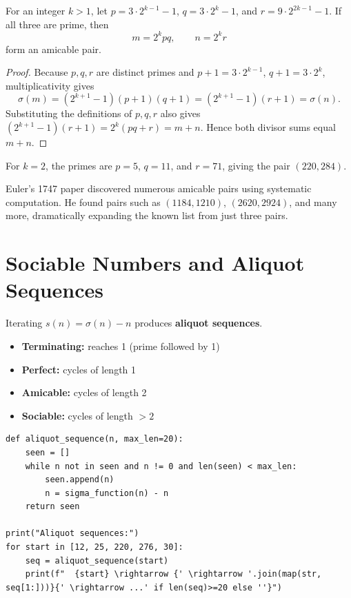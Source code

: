 \begin{theorem}
For an integer $k>1$, let $p=3\cdot2^{k-1}-1$, $q=3\cdot2^k-1$,
and $r=9\cdot2^{2k-1}-1$. If all three are prime, then
\[
m = 2^k p q, \qquad n = 2^k r
\]
form an amicable pair.
\end{theorem}

\begin{proof}
Because $p,q,r$ are distinct primes and $p+1=3\cdot2^{k-1}$,
$q+1=3\cdot2^k$, multiplicativity gives
\[
\sigma(m)=(2^{k+1}-1)(p+1)(q+1)
=(2^{k+1}-1)(r+1)=\sigma(n).
\]
Substituting the definitions of $p,q,r$ also gives
$(2^{k+1}-1)(r+1)=2^k(pq+r)=m+n$. Hence both divisor sums equal $m+n$.
\end{proof}

For $k=2$, the primes are $p=5$, $q=11$, and $r=71$, giving the pair
$(220,284)$.

\begin{historical}
Euler's 1747 paper discovered numerous amicable pairs using systematic computation. He found pairs such as $(1184, 1210)$, $(2620, 2924)$, and many more, dramatically expanding the known list from just three pairs.
\end{historical}

\section{Sociable Numbers and Aliquot Sequences}

Iterating $s(n) = \sigma(n) - n$ produces \textbf{aliquot sequences}.
\begin{itemize}
    \item \textbf{Terminating:} reaches 1 (prime followed by 1)
    \item \textbf{Perfect:} cycles of length 1
    \item \textbf{Amicable:} cycles of length 2
    \item \textbf{Sociable:} cycles of length $>2$
\end{itemize}

\begin{lstlisting}[caption={Aliquot sequences}, label=lst:aliquot]
def aliquot_sequence(n, max_len=20):
    seen = []
    while n not in seen and n != 0 and len(seen) < max_len:
        seen.append(n)
        n = sigma_function(n) - n
    return seen

print("Aliquot sequences:")
for start in [12, 25, 220, 276, 30]:
    seq = aliquot_sequence(start)
    print(f"  {start} \rightarrow {' \rightarrow '.join(map(str, seq[1:]))}{' \rightarrow ...' if len(seq)>=20 else ''}")
\end{lstlisting}

